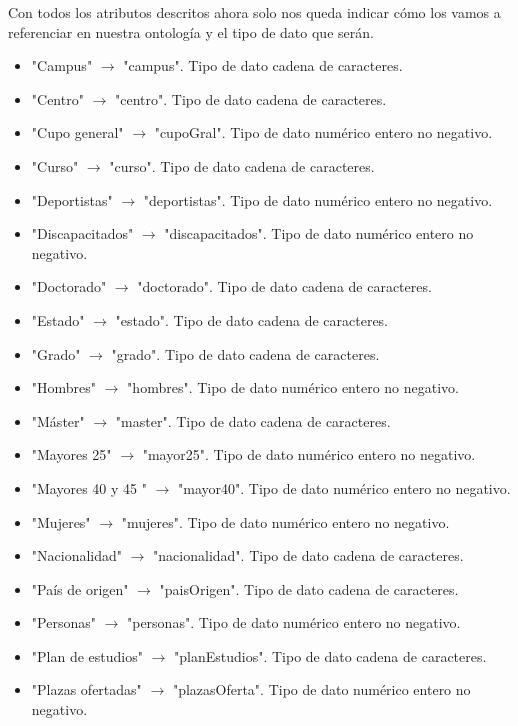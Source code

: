 Con todos los atributos descritos ahora solo nos queda indicar cómo los vamos a referenciar en nuestra ontología y el tipo de dato que serán.

\begin{itemize}
	\item "Campus" $\rightarrow$ "campus". Tipo de dato cadena de caracteres.
	\item "Centro" $\rightarrow$ "centro". Tipo de dato cadena de caracteres.
	\item "Cupo general" $\rightarrow$ "cupoGral". Tipo de dato numérico entero no negativo.
	\item "Curso" $\rightarrow$ "curso". Tipo de dato cadena de caracteres.
	\item "Deportistas" $\rightarrow$ "deportistas". Tipo de dato numérico entero no negativo.
	\item "Discapacitados" $\rightarrow$ "discapacitados". Tipo de dato numérico entero no negativo.
	\item "Doctorado" $\rightarrow$ "doctorado". Tipo de dato cadena de caracteres.
	\item "Estado" $\rightarrow$ "estado". Tipo de dato cadena de caracteres.
	\item "Grado" $\rightarrow$ "grado". Tipo de dato cadena de caracteres.
	\item "Hombres" $\rightarrow$ "hombres". Tipo de dato numérico entero no negativo.
	\item "Máster" $\rightarrow$ "master". Tipo de dato cadena de caracteres.
	\item "Mayores 25" $\rightarrow$ "mayor25". Tipo de dato numérico entero no negativo.
	\item "Mayores 40 y 45 " $\rightarrow$ "mayor40". Tipo de dato numérico entero no negativo.
	\item "Mujeres" $\rightarrow$ "mujeres". Tipo de dato numérico entero no negativo.
	\item "Nacionalidad" $\rightarrow$ "nacionalidad". Tipo de dato cadena de caracteres.
	\item "País de origen" $\rightarrow$ "paisOrigen". Tipo de dato cadena de caracteres.
	\item "Personas" $\rightarrow$ "personas". Tipo de dato numérico entero no negativo.
	\item "Plan de estudios" $\rightarrow$ "planEstudios". Tipo de dato cadena de caracteres.
	\item "Plazas ofertadas" $\rightarrow$ "plazasOferta". Tipo de dato numérico entero no negativo.

\end{itemize}
